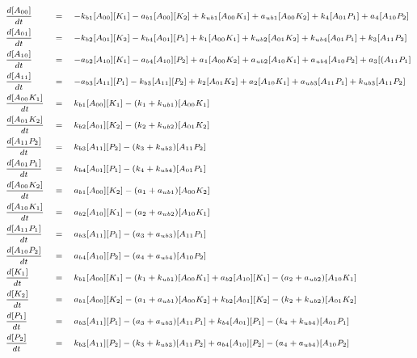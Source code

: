 \documentclass[9pt,lineno]{elife}
\begin{document}
\begin{appendixbox}
\begin{equation}
\scriptsize{    \begin{alignedat}{3}
& \frac{d[A_{00}]}{dt} \quad &&= \quad -k_{b1}[A_{00}][K_1]-a_{b1}[A_{00}][K_2]+k_{ub1}[A_{00}K_1]+a_{ub1}[A_{00}K_2]+k_4[A_{01}P_1]+a_4[A_{10}P_2] && \\ 
    & \frac{d[A_{01}]}{dt} \quad &&= \quad -k_{b2}[A_{01}][K_2]-k_{b4}[A_{01}][P_1]+k_1[A_{00}K_1]+k_{ub2}[A_{01}K_2]+k_{ub4}[A_{01}P_1]+k_3[A_{11}P_2] && \\ 
    & \frac{d[A_{10}]}{dt} \quad &&= \quad -a_{b2}[A_{10}][K_1]-a_{b4}[A_{10}][P_2]+a_1[A_{00}K_2]+a_{ub2}[A_{10}K_1]+a_{ub4}[A_{10}P_2]+a_3[(A_{11}P_1] && \\ 
    & \frac{d[A_{11}]}{dt} \quad &&= \quad -a_{b3}[A_{11}][P_1]-k_{b3}[A_{11}][P_2]+k_2[A_{01}K_2]+a_2[A_{10}K_1]+a_{ub3}[A_{11}P_1]+k_{ub3}[A_{11}P_2] && \\ 
    & \frac{d[A_{00}K_1]}{dt} \quad &&= \quad k_{b1}[A_{00}][K_1]-(k_1+k_{ub1})[A_{00}K_1] && \\ 
    & \frac{d[A_{01}K_2]}{dt} \quad &&= \quad k_{b2}[A_{01}][K_2]-(k_2+k_{ub2})[A_{01}K_2] && \\ 
    & \frac{d[A_{11}P_2]}{dt} \quad &&= \quad k_{b3}[A_{11}][P_2]-(k_3+k_{ub3})[A_{11}P_2] && \\ 
    & \frac{d[A_{01}P_1]}{dt} \quad &&= \quad k_{b4}[A_{01}][P_1]-(k_4+k_{ub4})[A_{01}P_1] && \\ 
    & \frac{d[A_{00}K_2]}{dt} \quad &&= \quad a_{b1}[A_{00}][K_2]-(a_1+a_{ub1})[A_{00}K_2] && \\ 
    & \frac{d[A_{10}K_1]}{dt} \quad &&= \quad a_{b2}[A_{10}][K_1]-(a_2+a_{ub2})[A_{10}K_1] && \\ 
    & \frac{d[A_{11}P_1]}{dt} \quad &&= \quad a_{b3}[A_{11}][P_1]-(a_3+a_{ub3})[A_{11}P_1] && \\ 
    & \frac{d[A_{10}P_2]}{dt} \quad &&= \quad a_{b4}[A_{10}][P_2]-(a_4+a_{ub4})[A_{10}P_2] && \\
    & \frac{d[K_1]}{dt} \quad &&= \quad k_{b1}[A_{00}][K_1]-(k_1+k_{ub1})[A_{00}K_1]+a_{b2}[A_{10}][K_1]-(a_2+a_{ub2})[A_{10}K_1] && \\
    & \frac{d[K_2]}{dt} \quad &&= \quad a_{b1}[A_{00}][K_2]-(a_1+a_{ub1})[A_{00}K_2]+k_{b2}[A_{01}][K_2]-(k_2+k_{ub2})[A_{01}K_2] && \\
    & \frac{d[P_1]}{dt} \quad &&= \quad a_{b3}[A_{11}][P_1]-(a_3+a_{ub3})[A_{11}P_1]+k_{b4}[A_{01}][P_1]-(k_4+k_{ub4})[A_{01}P_1] && \\
    & \frac{d[P_2]}{dt} \quad &&= \quad  k_{b3}[A_{11}][P_2]-(k_3+k_{ub3})[A_{11}P_2]+a_{b4}[A_{10}][P_2]-(a_4+a_{ub4})[A_{10}P_2] && \\
    \end{alignedat} }
\end{equation}


\end{appendixbox}
\end{document}
